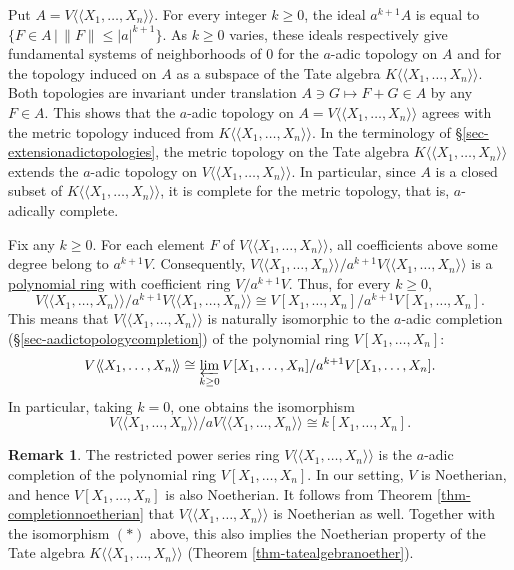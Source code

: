 \documentclass[a4paper,12pt, dvipdfmx]{jsbook}
\def\dl{\langle\!\langle}
\def\dr{\rangle\!\rangle}
\newcommand{\abs}[1]{\lvert#1\rvert}
\newcommand{\abss}[1]{\|#1\|}
\theoremstyle{plain}
\theoremstyle{definition}
\newtheorem{rem}[thm]{\bfseries Remark}
\begin{document}
Put $A=V\dl X_1,\ldots,X_n\dr$. For every integer $k\geq 0$, the ideal $a^{k+1}A$ is equal to $\{F\in A\,|\,\abss{F}\leq\abs{a}^{k+1}\}$.
As $k\geq 0$ varies, these ideals respectively give fundamental systems of neighborhoods of $0$ for the $a$-adic topology on $A$ and for the topology induced on $A$ as a subspace of the Tate algebra $K\dl X_1,\ldots,X_n\dr$.
Both topologies are invariant under translation $A\ni G\mapsto F+G\in A$ by any $F\in A$. This shows that the $a$-adic topology on $A=V\dl X_1,\ldots,X_n\dr$ agrees with the metric topology induced from $K\dl X_1,\ldots,X_n\dr$.
In the terminology of \S\ref{sec-extensionadictopologies}, the metric topology on the Tate algebra $K\dl X_1,\ldots,X_n\dr$ extends the $a$-adic topology on $V\dl X_1,\ldots,X_n\dr$.
In particular, since $A$ is a closed subset of $K\dl X_1,\ldots,X_n\dr$, it is complete for the metric topology, that is, $a$-adically complete.

Fix any $k\geq 0$. For each element $F$ of $V\dl X_1,\ldots,X_n\dr$, all coefficients above some degree belong to $a^{k+1}V$.
Consequently, $V\dl X_1,\ldots,X_n\dr/a^{k+1}V\dl X_1,\ldots,X_n\dr$ is a \underline{polynomial ring} with coefficient ring $V/a^{k+1}V$.
Thus, for every $k\geq 0$,
$$
V\dl X_1,\ldots,X_n\dr/a^{k+1}V\dl X_1,\ldots,X_n\dr\cong V[X_1,\ldots,X_n]/a^{k+1}V[X_1,\ldots,X_n].
$$
This means that $V\dl X_1,\ldots,X_n\dr$ is naturally isomorphic to the $a$-adic completion (\S\ref{sec-aadictopologycompletion}) of the polynomial ring $V[X_1,\ldots,X_n]$:
$$
V\dl X_1,\ldots,X_n\dr\cong\varprojlim_{k\geq 0}V[X_1,\ldots,X_n]/a^{k+1}V[X_1,\ldots,X_n].
$$
In particular, taking $k=0$, one obtains the isomorphism
$$
V\dl X_1,\ldots,X_n\dr/aV\dl X_1,\ldots,X_n\dr\cong k[X_1,\ldots,X_n].
$$

\begin{rem}\label{rem-noetheriannesstatealgebra}{\rm 
The restricted power series ring $V\dl X_1,\ldots,X_n\dr$ is the $a$-adic completion of the polynomial ring $V[X_1,\ldots,X_n]$. In our setting, $V$ is Noetherian, and hence $V[X_1,\ldots,X_n]$ is also Noetherian.
It follows from Theorem \ref{thm-completionnoetherian} that $V\dl X_1,\ldots,X_n\dr$ is Noetherian as well.
Together with the isomorphism $(\ast)$ above, this also implies the Noetherian property of the Tate algebra $K\dl X_1,\ldots,X_n\dr$ (Theorem \ref{thm-tatealgebranoether}).}
\end{rem}
\end{document}
